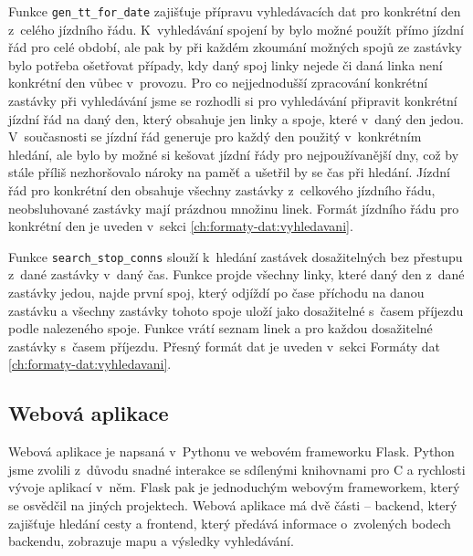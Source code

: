 Funkce {\tt gen\_tt\_for\_date} zajišťuje přípravu vyhledávacích dat pro
konkrétní den z~celého jízdního řádu. K~vyhledávání spojení by bylo možné použít
přímo jízdní řád pro celé období, ale pak by při každém zkoumání možných spojů
ze zastávky bylo potřeba ošetřovat případy, kdy daný spoj linky nejede či daná
linka není konkrétní den vůbec v~provozu. Pro co nejjednodušší zpracování
konkrétní zastávky při vyhledávání jsme se rozhodli si pro vyhledávání připravit
konkrétní jízdní řád na daný den, který obsahuje jen linky a spoje, které v~daný
den jedou. V~současnosti se jízdní řád generuje pro každý den použitý
v~konkrétním hledání, ale bylo by možné si kešovat jízdní řády pro nejpoužívanější
dny, což by stále příliš nezhoršovalo nároky na paměť a ušetřil by se čas při
hledání. Jízdní řád pro konkrétní den obsahuje všechny zastávky z~celkového
jízdního řádu, neobsluhované zastávky mají prázdnou množinu linek. Formát
jízdního řádu pro konkrétní den je uveden v~sekci \ref{ch:formaty-dat:vyhledavani}.

Funkce {\tt search\_stop\_conns} slouží k~hledání zastávek dosažitelných bez
přestupu z~dané zastávky v~daný čas. Funkce projde všechny linky, které daný den
z~dané zastávky jedou, najde první spoj, který odjíždí po čase příchodu na danou
zastávku a všechny zastávky tohoto spoje uloží jako dosažitelné s~časem příjezdu
podle nalezeného spoje. Funkce vrátí seznam linek a pro každou dosažitelné
zastávky s~časem příjezdu. Přesný formát dat je uveden v~sekci Formáty dat
\ref{ch:formaty-dat:vyhledavani}.

\subsection{Webová aplikace}
\label{ch:implementace:webapp}
Webová aplikace je napsaná v~Pythonu ve webovém frameworku Flask\cite{Flask}.
Python jsme zvolili z~důvodu snadné interakce se sdílenými knihovnami pro C a
rychlosti vývoje aplikací v~něm. Flask pak je jednoduchým webovým frameworkem,
který se osvědčil na jiných projektech. Webová aplikace má dvě části -- backend,
který zajišťuje hledání cesty a frontend, který předává informace o~zvolených
bodech backendu, zobrazuje mapu a výsledky vyhledávání. 

